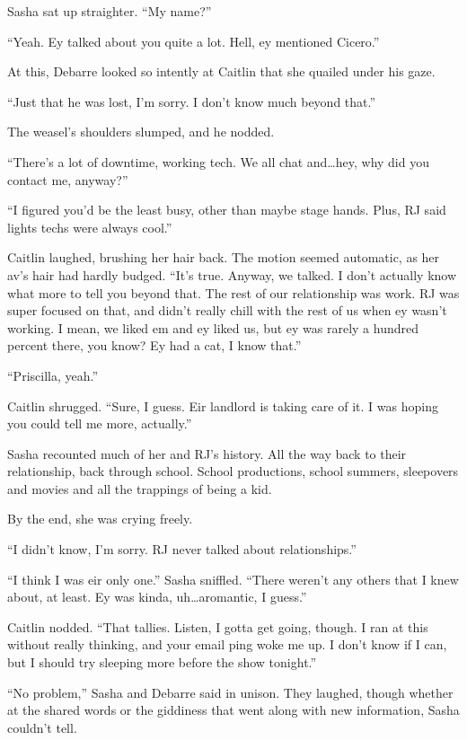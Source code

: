 Sasha sat up straighter. ``My name?''

``Yeah. Ey talked about you quite a lot. Hell, ey mentioned Cicero.''

At this, Debarre looked so intently at Caitlin that she quailed under his gaze.

``Just that he was lost, I'm sorry. I don't know much beyond that.''

The weasel's shoulders slumped, and he nodded.

``There's a lot of downtime, working tech. We all chat and\ldots{}hey, why did you contact me, anyway?''

``I figured you'd be the least busy, other than maybe stage hands. Plus, RJ said lights techs were always cool.''

Caitlin laughed, brushing her hair back. The motion seemed automatic, as her av's hair had hardly budged. ``It's true. Anyway, we talked. I don't actually know what more to tell you beyond that. The rest of our relationship was work. RJ was super focused on that, and didn't really chill with the rest of us when ey wasn't working. I mean, we liked em and ey liked us, but ey was rarely a hundred percent there, you know? Ey had a cat, I know that.''

``Priscilla, yeah.''

Caitlin shrugged. ``Sure, I guess. Eir landlord is taking care of it. I was hoping you could tell me more, actually.''

Sasha recounted much of her and RJ's history. All the way back to their relationship, back through school. School productions, school summers, sleepovers and movies and all the trappings of being a kid.

By the end, she was crying freely.

``I didn't know, I'm sorry. RJ never talked about relationships.''

``I think I was eir only one.'' Sasha sniffled. ``There weren't any others that I knew about, at least. Ey was kinda, uh\ldots{}aromantic, I guess.''

Caitlin nodded. ``That tallies. Listen, I gotta get going, though. I ran at this without really thinking, and your email ping woke me up. I don't know if I can, but I should try sleeping more before the show tonight.''

``No problem,'' Sasha and Debarre said in unison. They laughed, though whether at the shared words or the giddiness that went along with new information, Sasha couldn't tell.

